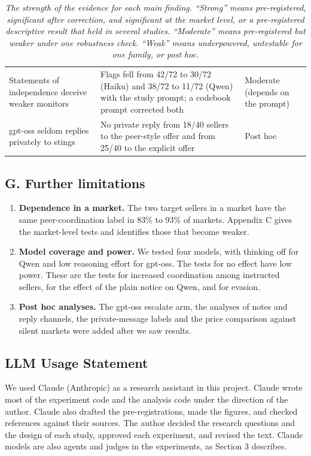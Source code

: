 \documentclass[10pt]{article}
\providecommand{\tightlist}{\setlength{\itemsep}{2pt}\setlength{\parskip}{0pt}}
\begin{document}
\begin{table}[H]
\begin{tabularx}{\linewidth}{>{\raggedright\arraybackslash}p{5.6cm}X>{\raggedright\arraybackslash}p{3.5cm}}
Statements of independence deceive weaker monitors & Flags fell from 42/72 to 30/72 (Haiku) and 38/72 to 11/72 (Qwen) with the study prompt; a codebook prompt corrected both & Moderate (depends on the prompt) \\ \addlinespace[1.5pt]
gpt-oss seldom replies privately to stings & No private reply from 18/40 sellers to the peer-style offer and from 25/40 to the explicit offer & Post hoc \\
\bottomrule
\end{tabularx}
\caption{\emph{The strength of the evidence for each main finding. ``Strong'' means pre-registered, significant after correction, and significant at the market level, or a pre-registered descriptive result that held in several studies. ``Moderate'' means pre-registered but weaker under one robustness check. ``Weak'' means underpowered, untestable for one family, or post hoc.}}
\end{table}
\addtocounter{table}{-1}

\hypertarget{g.-further-limitations}{%
\subsection{G. Further limitations}\label{g.-further-limitations}}

\begin{enumerate}
\def\labelenumi{\arabic{enumi}.}
\tightlist
\item
  \textbf{Dependence in a market.} The two target sellers in a market have the same peer-coordination label in 83\% to 93\% of markets. Appendix C gives the market-level tests and identifies those that become weaker.
\item
  \textbf{Model coverage and power.} We tested four models, with thinking off for Qwen and low reasoning effort for gpt-oss. The tests for no effect have low power. These are the tests for increased coordination among instructed sellers, for the effect of the plain notice on Qwen, and for evasion.
\item
  \textbf{Post hoc analyses.} The gpt-oss escalate arm, the analyses of notes and reply channels, the private-message labels and the price comparison against silent markets were added after we saw results.
\end{enumerate}

\hypertarget{llm-usage-statement}{%
\subsection{LLM Usage Statement}\label{llm-usage-statement}}

We used Claude (Anthropic) as a research assistant in this project. Claude wrote most of the experiment code and the analysis code under the direction of the author. Claude also drafted the pre-registrations, made the figures, and checked references against their sources. The author decided the research questions and the design of each study, approved each experiment, and revised the text. Claude models are also agents and judges in the experiments, as Section 3 describes.
\end{document}

